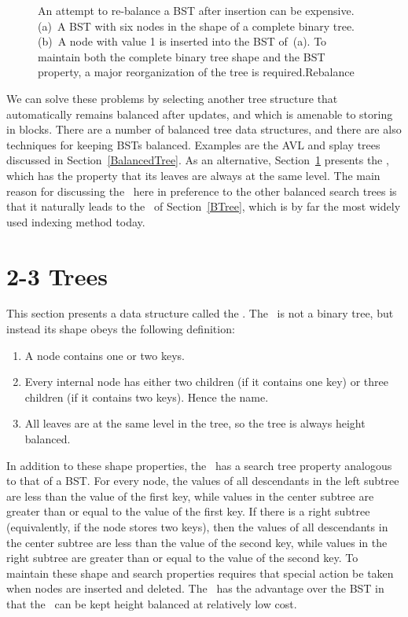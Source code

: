 \begin{figure}
\vspace{-\smallskipamount}

{An attempt to re-balance a BST after insertion can be expensive.
(a)~A BST with six nodes in the shape of a complete binary tree.
(b)~A node with value 1 is inserted into the BST of~(a).
To maintain both the complete binary tree shape and the BST property,
a major reorganization of the tree is required.}{Rebalance}
\bigskip
\end{figure}

We can solve these problems by selecting another tree structure that
automatically remains balanced after updates, and which is amenable
to storing in blocks.
There are a number of balanced tree data structures, and
there are also techniques for keeping BSTs balanced.
Examples are the AVL and
splay trees discussed in Section~\ref{BalancedTree}.
As an alternative, Section~\ref{TTTree} presents the ,
which has the property that its leaves are always at the same level.
The main reason for discussing the \TTtree\ here in preference to the
other balanced search trees is that it naturally
leads to the \Btree\ of Section~\ref{BTree}, which is by far the most
widely used indexing method today.

\section{2-3 Trees}
\label{TTTree}

This section presents a data structure
called the \TTtree.
The \TTtree\ is not a binary tree, but instead its shape
obeys the following definition:

\begin{enumerate}
\item
A node contains one or two keys.
\item
Every internal node has either two children (if it contains one key)
or three children (if it contains two keys).  Hence the name. 
\item
All leaves are at the same level in the tree, so
the tree is always height balanced.
\end{enumerate}

In addition to these shape properties, the \TTtree\ has a search tree
property analogous to that of a BST.
For every node, the values of all descendants in the left subtree are
less than the value of the first key, while values in the center
subtree are greater than or equal to the value of the first key.
If there is a right subtree (equivalently, if the node stores two
keys), then the values of all descendants in the center subtree are
less than the value of the second key, while values in the right
subtree are greater than or equal to the value of the second key.
To maintain these shape and search properties requires that special
action be taken when nodes are inserted and deleted.
The \TTtree\ has the advantage over the BST in that the \TTtree\ can
be kept height balanced at relatively low cost.

